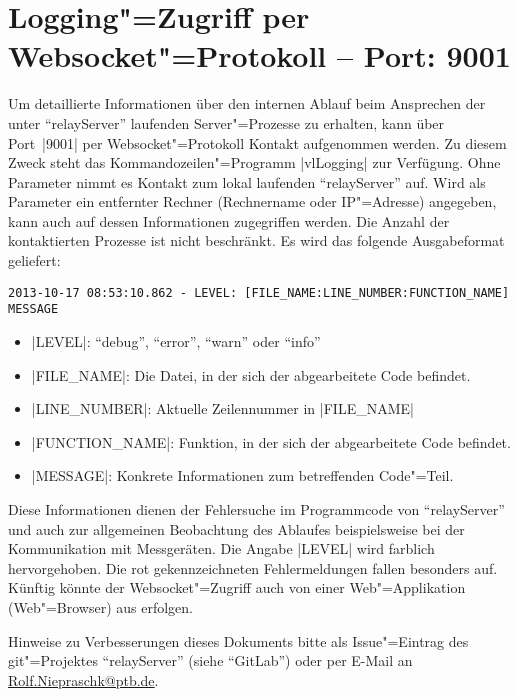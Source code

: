 \documentclass[titlepage=false,toc=nobibliography]{vl-report}
\newcommand*\theServer{relayServer}
\begin{document}
\section{Logging"=Zugriff per Websocket"=Protokoll -- Port: 9001}

Um detaillierte Informationen über den internen Ablauf beim Ansprechen der
unter "`\theServer"' laufenden Server"=Prozesse zu erhalten, kann über
Port~|9001| per Websocket"=Protokoll Kontakt aufgenommen werden. Zu
diesem Zweck steht das Kommandozeilen"=Programm |vlLogging| zur Verfügung.
Ohne Parameter nimmt es Kontakt zum lokal laufenden "`\theServer"' auf.
Wird als Parameter ein entfernter Rechner (Rechnername oder IP"=Adresse)
angegeben, kann auch auf dessen Informationen zugegriffen
werden. Die Anzahl der kontaktierten Prozesse ist nicht beschränkt. Es wird
das folgende Ausgabeformat geliefert:
\begin{lstlisting}[language={}]
2013-10-17 08:53:10.862 - LEVEL: [FILE_NAME:LINE_NUMBER:FUNCTION_NAME] MESSAGE
\end{lstlisting}
\begin{itemize}
  \item |LEVEL|: "`debug"', "`error"', "`warn"' oder "`info"'
  \item |FILE_NAME|: Die Datei, in der sich der abgearbeitete Code befindet.
  \item |LINE_NUMBER|: Aktuelle Zeilennummer in |FILE_NAME|
  \item |FUNCTION_NAME|: Funktion, in der sich der abgearbeitete Code befindet.
  \item |MESSAGE|: Konkrete Informationen zum betreffenden Code"=Teil.
\end{itemize}
%
Diese Informationen dienen der Fehlersuche im Programmcode von
"`\theServer"' und auch zur allgemeinen Beobachtung des Ablaufes
beispielsweise bei der Kommunikation mit Messgeräten. Die Angabe |LEVEL|
wird farblich hervorgehoben. Die rot gekennzeichneten Fehlermeldungen fallen
besonders auf. Künftig könnte der Websocket"=Zugriff auch von einer
Web"=Applikation (Web"=Browser) aus erfolgen.

\mbox{}\vfill\par\bigskip
\begingroup \small \itshape

\noindent Hinweise zu Verbesserungen dieses Dokuments bitte als
Issue"=Eintrag des git"=Projektes "`\theServer"' (siehe "`GitLab"') oder per
E-Mail an \url{Rolf.Niepraschk@ptb.de}.

\endgroup
\end{document}
